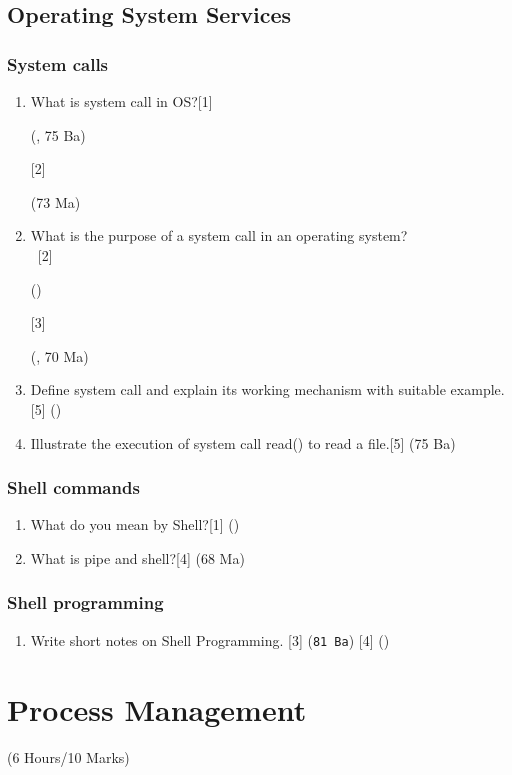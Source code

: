 \documentclass[12pt]{article}
\newcommand{\enter}{\\\textcolor{white}{1}}
\begin{document}
	\subsection{Operating System Services}
	\subsubsection{System calls}
	\begin{enumerate}
	\item What is system call in OS?\hfill[1] \begin{small}(, 75 Ba)\end{small} [2] \begin{small}(73 Ma)\end{small}
	\item What is the purpose of a system call in an operating system?
	\enter\hfill[2] \begin{small}()\end{small} [3] \begin{small}(, 70 Ma)\end{small}
	\item Define system call and explain its working mechanism with suitable example.\hfill[5] ()
	\item Illustrate the execution of system call read() to read a file.\hfill[5] (75 Ba)
	\end{enumerate}
	\subsubsection{Shell commands}
	\begin{enumerate}
	\item What do you mean by Shell?\hfill[1] ()
	\item What is pipe and shell?\hfill[4] (68 Ma)
	\end{enumerate}
	\subsubsection{Shell programming}
	\begin{enumerate}
	\item Write short notes on Shell Programming. \hfill [3] (\texttt{81 Ba}) [4] ()
	\end{enumerate}

	\pagebreak

\section{Process Management}
	\begin{center}(6 Hours/10 Marks)\end{center}
\end{document}
